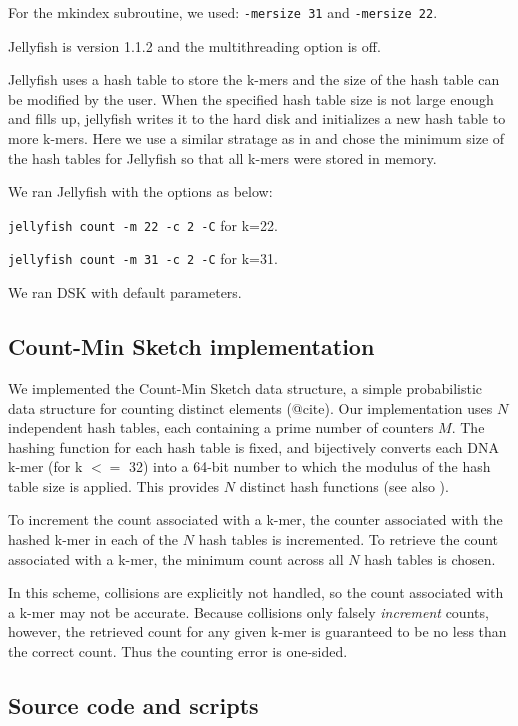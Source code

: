 \documentclass{article}
\begin{document}
For the mkindex subroutine, we used: {\tt -mersize 31} and {\tt -mersize 22}.

Jellyfish is version 1.1.2 and the multithreading option is off.


Jellyfish uses a hash table to store the k-mers and the size of the
hash table can be modified by the user.  When the specified hash table
size is not large enough and fills up, jellyfish writes it to the hard
disk and initializes a new hash table to more k-mers.  Here we use a
similar stratage as in \cite{XX} and chose the minimum size of the hash
tables for Jellyfish so that all k-mers were stored in memory.

We ran Jellyfish with the options as below:

{\tt jellyfish count -m 22 -c 2 -C} for k=22.

{\tt jellyfish count -m 31 -c 2 -C} for k=31.

We ran DSK with default parameters.

\subsection{Count-Min Sketch implementation}

We implemented the Count-Min Sketch data structure, a simple
probabilistic data structure for counting distinct elements (@cite).  Our
implementation uses $N$ independent hash tables, each containing a
prime number of counters $M$.  The hashing function for each hash
table is fixed, and bijectively converts each DNA k-mer (for k $<=$ 32)
into a 64-bit number to which the modulus of the hash table size is
applied.  This provides $N$ distinct hash functions (see also
\cite{kmer-percolation}).

To increment the count associated with a k-mer, the counter associated
with the hashed k-mer in each of the $N$ hash tables is incremented.
To retrieve the count associated with a k-mer, the minimum count
across all $N$ hash tables is chosen.

In this scheme, collisions are explicitly not handled, so the count
associated with a k-mer may not be accurate. Because collisions only
falsely {\em increment} counts, however, the retrieved count for any
given k-mer is guaranteed to be no less than the correct count.  Thus
the counting error is one-sided.

\subsection{Source code and scripts}
\end{document}
